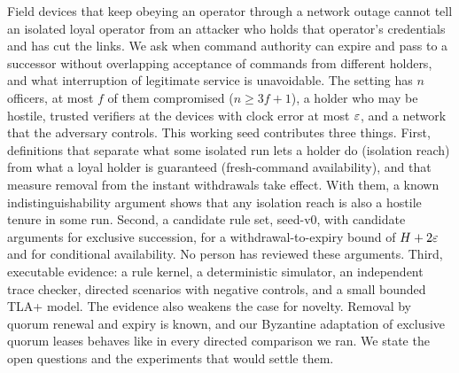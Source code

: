 Field devices that keep obeying an operator through a network outage cannot tell an
isolated loyal operator from an attacker who holds that operator's credentials and has cut
the links. We ask when command authority can expire and pass to a successor without
overlapping acceptance of commands from different holders, and what interruption of
legitimate service is unavoidable. The setting has $n$ officers, at most $f$ of them
compromised ($n \ge 3f + 1$), a holder who may be hostile, trusted verifiers at the devices
with clock error at most $\varepsilon$, and a network that the adversary controls. This working
seed contributes three things. First, definitions that separate what some isolated run
lets a holder do (isolation reach) from what a loyal holder is guaranteed (fresh-command
availability), and that measure removal from the instant withdrawals take effect. With
them, a known indistinguishability argument shows that any isolation reach is also a
hostile tenure in some run. Second,
a candidate rule set, \sys{} seed-v0, with candidate arguments for exclusive succession,
for a withdrawal-to-expiry bound of $H + 2\varepsilon$ and for conditional availability. No
person has reviewed these arguments. Third, executable evidence: a rule kernel, a
deterministic simulator, an independent trace checker, \SeedScenarioCount{} directed
scenarios with negative controls, and a small bounded TLA+ model. The evidence also
weakens the case for novelty. Removal by quorum renewal and expiry is known, and our
Byzantine adaptation of exclusive quorum leases behaves like \sys{} in every directed
comparison we ran. We state the open questions and the experiments that would settle them.
